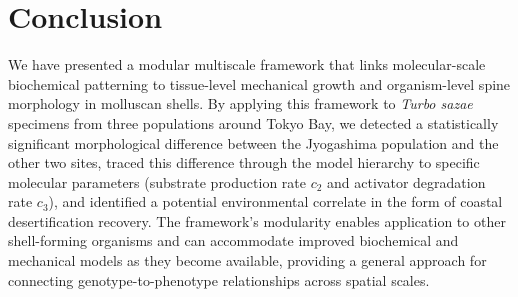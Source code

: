 \documentclass[11pt]{article}
\begin{document}
\section{Conclusion}

We have presented a modular multiscale framework that links molecular-scale biochemical patterning to tissue-level mechanical growth and organism-level spine morphology in molluscan shells. By applying this framework to \textit{Turbo sazae} specimens from three populations around Tokyo Bay, we detected a statistically significant morphological difference between the Jyogashima population and the other two sites, traced this difference through the model hierarchy to specific molecular parameters (substrate production rate $c_2$ and activator degradation rate $c_3$), and identified a potential environmental correlate in the form of coastal desertification recovery. The framework's modularity enables application to other shell-forming organisms and can accommodate improved biochemical and mechanical models as they become available, providing a general approach for connecting genotype-to-phenotype relationships across spatial scales.



\end{document}

